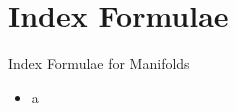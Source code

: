 \section{Index Formulae}

\begin{frame}{Index Formulae for Manifolds}
    \begin{itemize}
        \item a
    \end{itemize}
\end{frame}
